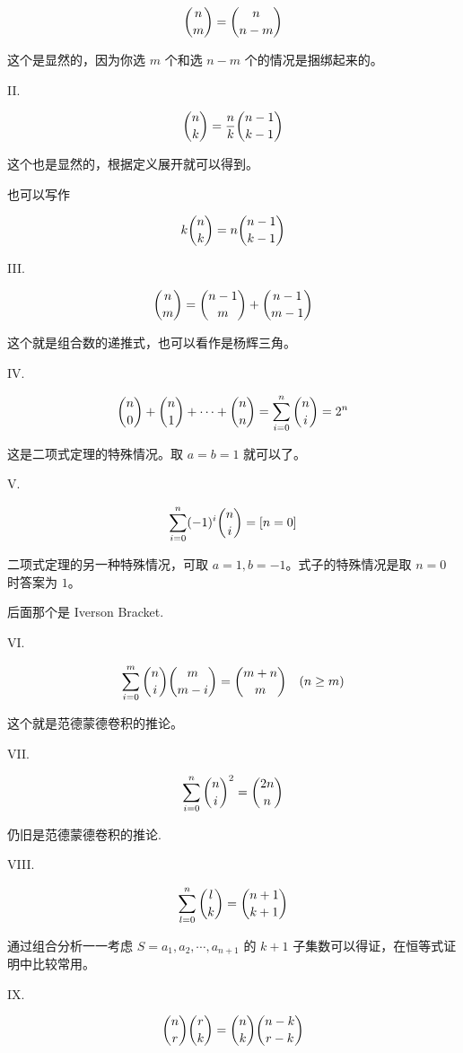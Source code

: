\documentclass[titlepage, a4paper]{article}
\begin{document}
\begin{multicols}{2}
\begin{spacing}{0.6}
				 	$$
				 	\dbinom{n}{m}=\dbinom{n}{n-m}
				 	$$
				 	
				 	这个是显然的，因为你选 $m$ 个和选 $n - m$ 个的情况是捆绑起来的。
				 	
				 	II.
				 	
				 	$$
				 	\dbinom{n}{k} = \dfrac{n}{k} \dbinom{n-1}{k-1}
				 	$$
				 	
				 	这个也是显然的，根据定义展开就可以得到。
				 	
				 	也可以写作
				 	
				 	$$
				 	k\dbinom{n}{k} = n\dbinom{n - 1}{k - 1}
				 	$$
				 	
				 	III.
				 	
				 	$$
				 	\dbinom{n}{m}=\dbinom{n-1}{m}+\dbinom{n-1}{m-1}
				 	$$
				 	
				 	这个就是组合数的递推式，也可以看作是杨辉三角。
				 	
				 	IV. 
				 	
				 	$$
				 	\dbinom{n}{0}+\dbinom{n}{1}+\cdots+\dbinom{n}{n}=\sum_{i=0}^n\dbinom{n}{i}=2^n
				 	$$
				 	
				 	这是二项式定理的特殊情况。取 $a=b=1$ 就可以了。
				 	
				 	
				 	V.
				 	
				 	$$
				 	\sum_{i=0}^n(-1)^i\dbinom{n}{i}=[n=0]
				 	$$
				 	
				 	二项式定理的另一种特殊情况，可取 $a=1, b=-1$。式子的特殊情况是取 $n=0$ 时答案为 $1$。
				 	
				 	后面那个是 Iverson Bracket.
				 	
				 	VI.
				 	
				 	$$
				 	\sum_{i=0}^m \dbinom{n}{i}\dbinom{m}{m-i} = \dbinom{m+n}{m}\ \ \ (n \geq m)
				 	$$
				 	
				 	这个就是范德蒙德卷积的推论。
				 	
				 	VII.
				 	
				 	$$
				 	\sum_{i=0}^n\dbinom{n}{i}^2=\dbinom{2n}{n}
				 	$$
				 	
				 	仍旧是范德蒙德卷积的推论.
				 	
				 	VIII.
				 	
				 	$$
				 	\sum_{l=0}^n\dbinom{l}{k} = \dbinom{n+1}{k+1}
				 	$$
				 	
				 	通过组合分析一一考虑 $S={a_1, a_2, \cdots, a_{n+1}}$ 的 $k+1$ 子集数可以得证，在恒等式证明中比较常用。
				 	
				 	IX.
				 	
				 	$$
				 	\dbinom{n}{r}\dbinom{r}{k} = \dbinom{n}{k}\dbinom{n-k}{r-k}
				 	$$
				 	

\end{spacing}
\end{multicols}
\end{document}
